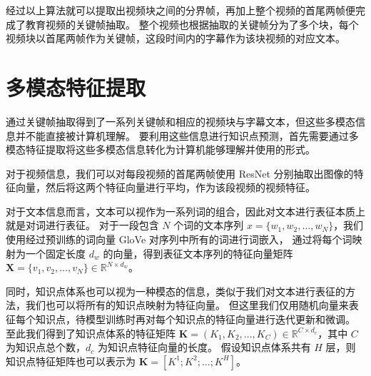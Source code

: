     经过以上算法就可以提取出视频块之间的分界帧，再加上整个视频的首尾两帧便完成了教育视频的关键帧抽取。
    整个视频也根据抽取的关键帧分为了多个块，每个视频块以首尾两帧作为关键帧，这段时间内的字幕作为该块视频的对应文本。


\section{多模态特征提取}
    通过关键帧抽取得到了一系列关键帧和相应的视频块与字幕文本，但这些多模态信息并不能直接被计算机理解。
    要利用这些信息进行知识点预测，首先需要通过多模态特征提取将这些多模态信息转化为计算机能够理解并使用的形式。

    对于视频信息，我们可以对每段视频的首尾两帧使用 ResNet\cite{He2016DeepRL} 分别抽取出图像的特征向量，然后将这两个特征向量进行平均，作为该段视频的视频特征。

    对于文本信息而言，文本可以视作为一系列词的组合，因此对文本进行表征本质上就是对词进行表征。
    对于一段包含 $N$ 个词的文本序列 $x = \{w_1, w_2, \dots, w_N\}$，我们使用经过预训练的词向量 GloVe\cite{Pennington2014GloVeGV} 对序列中所有的词进行词嵌入，
    通过将每个词映射为一个固定长度 $d_w$ 的向量，得到表征文本序列的特征向量矩阵 $\boldsymbol{X} = \{v_1, v_2, \dots, v_N\} \in \mathbb{R}^{N \times d_{w}}$。

    同时，知识点体系也可以视为一种模态的信息，类似于我们对文本进行表征的方法，我们也可以将所有的知识点映射为特征向量。
    但这里我们仅用随机向量来表征每个知识点，待模型训练时再对每个知识点的特征向量进行迭代更新和微调。
    至此我们得到了知识点体系的特征矩阵 $\boldsymbol{K} = (K_1, K_2, \dots, K_C) \in \mathbb{R}^{C \times d_c}$，其中 $C$ 为知识点总个数，$d_c$ 为知识点特征向量的长度。
    假设知识点体系共有 $H$ 层，则知识点特征矩阵也可以表示为 $\boldsymbol{K} = [K^1; K^2; \dots; K^H]$。


